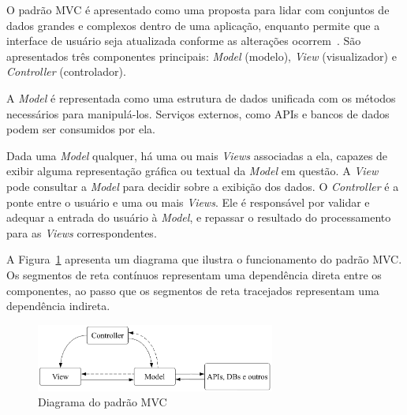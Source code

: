 O padrão MVC é apresentado como uma proposta para lidar com conjuntos de dados grandes e complexos dentro de uma aplicação, enquanto permite que a interface de usuário seja atualizada conforme as alterações ocorrem~\cite{mvc-paper}.
São apresentados três componentes principais: \emph{Model} (modelo), \emph{View} (visualizador) e \emph{Controller} (controlador).

A \emph{Model} é representada como uma estrutura de dados unificada com os métodos necessários para manipulá-los.
Serviços externos, como APIs e bancos de dados podem ser consumidos por ela.

Dada uma \emph{Model} qualquer, há uma ou mais \emph{Views} associadas a ela, capazes de exibir alguma representação gráfica ou textual da \emph{Model} em questão.
A \emph{View} pode consultar a \emph{Model} para decidir sobre a exibição dos dados.
O \emph{Controller} é a ponte entre o usuário e uma ou mais \emph{Views}.
Ele é responsável por validar e adequar a entrada do usuário à \emph{Model}, e repassar o resultado do processamento para as \emph{Views} correspondentes.

A Figura~\ref{fig:mvc} apresenta um diagrama que ilustra o funcionamento do padrão MVC.
Os segmentos de reta contínuos representam uma dependência direta entre os componentes, ao passo que os segmentos de reta tracejados representam uma dependência indireta.

\begin{figure}[ht]
	\centering
	\includegraphics[width=0.7\textwidth]{images/mvc.png}
	\caption{Diagrama do padrão MVC}
	\label{fig:mvc}
\end{figure}